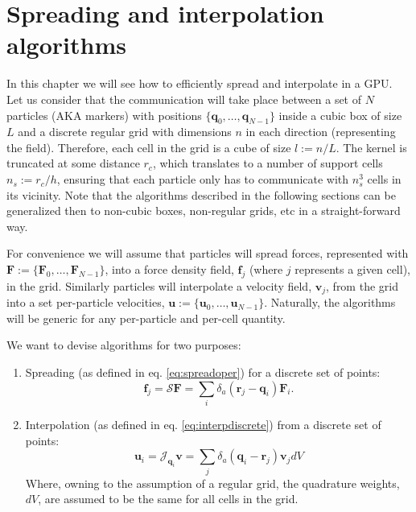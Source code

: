 \documentclass[ twoside,openright,titlepage,numbers=noenddot,%
headinclude,footinclude,cleardoublepage=empty,abstract=on,
BCOR=5mm,paper=a4,fontsize=11pt, dvipsnames
]{scrreprt}
\renewcommand{\vec}[1]{\bm{#1}}
\newcommand{\oper}[1]{\mathcal{#1}}
\newcommand{\gpu}{\gls{GPU}\xspace}
\newcommand{\ppos}{q}
\newcommand{\pvel}{u}
\newcommand{\fpos}{r}
\newcommand{\fvel}{v}
\begin{document}
\section{Spreading and interpolation algorithms}
In this chapter we will see how to efficiently spread and interpolate in a \gpu.
Let us consider that the communication will take place between a set of $N$ particles (AKA markers) with positions $\{\vec{\ppos}_0,\dots,\vec{\ppos}_{N-1}\}$ inside a cubic box of size $L$ and a discrete regular grid with dimensions $n$ in each direction (representing the field). Therefore, each cell in the grid is a cube of size $l := n/L$. The kernel is truncated at some distance $r_c$, which translates to a number of support cells $n_s:=r_c/h$, ensuring that each particle only has to communicate with $n_s^3$ cells in its vicinity. Note that the algorithms described in the following sections can be generalized then to non-cubic boxes, non-regular grids, etc in a straight-forward way.

For convenience we will assume that particles will spread forces, represented with $\vec{F}:=\{\vec{F}_0,\dots,\vec{F}_{N-1}\}$, into a force density field, $\vec{f}_j$ (where $j$ represents a given cell), in the grid. Similarly particles will interpolate a velocity field, $\vec{\fvel}_j$, from the grid into a set per-particle velocities, $\vec{\pvel}:=\{\vec{\pvel}_0,\dots,\vec{\pvel}_{N-1}\}$. Naturally, the algorithms will be generic for any per-particle and per-cell quantity.

We want to devise algorithms for two purposes:
\begin{enumerate}
\item Spreading (as defined in eq. \eqref{eq:spreadoper}) for a discrete set of points:
  \begin{equation}
    \vec{f}_j = \oper{S}\vec{F} = \sum_i \delta_a(\vec{\fpos}_j-\vec{\ppos}_i) \vec{F}_i.
  \end{equation}
\item Interpolation (as defined in eq. \eqref{eq:interpdiscrete}) from a discrete set of points:
  \begin{equation}
    \label{eq:interpdiscrete}
    \vec{u}_i = \oper{J}_{\vec{\ppos}_i}\vec{\fvel} = \sum_j{\delta_a(\vec{\ppos}_i - \vec{\fpos}_j)\vec{\fvel}_jdV}
  \end{equation}
  Where, owning to the assumption of a regular grid, the quadrature weights, $dV$, are assumed to be the same for all cells in the grid.
\end{enumerate}
\end{document}
